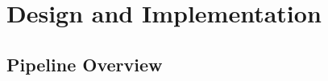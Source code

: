 %
%
%
%
%
%
%
%

\chapter{Design and Implementation}
\label{chap:implementation}

\section{Pipeline Overview}
\label{sec:pipeline-overview}

%
%
%

